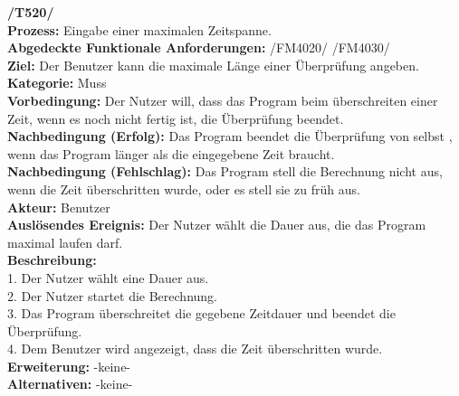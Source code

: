 \documentclass[a4paper]{scrreprt}
\begin{document}
\textbf{/T520/}\\
\textbf{Prozess:} Eingabe einer maximalen Zeitspanne. \\
\textbf{Abgedeckte Funktionale Anforderungen:} /FM4020/ /FM4030/ \\
\textbf{Ziel:} Der Benutzer kann die maximale Länge einer Überprüfung angeben.\\
\textbf{Kategorie:} Muss\\
\textbf{Vorbedingung:} Der Nutzer will, dass das Program beim
überschreiten einer Zeit, wenn es noch nicht fertig ist, die Überprüfung
beendet.\\
\textbf{Nachbedingung (Erfolg):} Das Program beendet die Überprüfung von selbst
, wenn das Program länger als die eingegebene Zeit braucht.\\
\textbf{Nachbedingung (Fehlschlag):} Das Program stell die Berechnung nicht
aus, wenn die Zeit überschritten wurde, oder es stell sie zu früh aus.\\
\textbf{Akteur:} Benutzer\\
\textbf{Auslösendes Ereignis:} Der Nutzer wählt die Dauer aus, die das Program
maximal laufen darf.\\
\textbf{Beschreibung:} \\
1. Der Nutzer wählt eine Dauer aus.\\
2. Der Nutzer startet die Berechnung.\\
3. Das Program überschreitet die gegebene Zeitdauer und beendet die
Überprüfung.\\
4. Dem Benutzer wird angezeigt, dass die Zeit überschritten wurde.\\
\textbf {Erweiterung:}  -keine- \\
\textbf {Alternativen:} -keine- \\ \\
\end{document}
